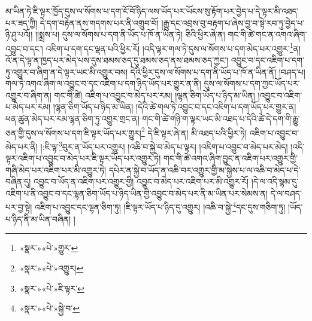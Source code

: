 མ་ཡིན་ཏེ་ཇི་ལྟར་ཁྱོད་དུས་ལ་སོགས་པ་དག་ངོ་བོ་ཉིད་ལས་ཡོད་པར་ཡོངས་སུ་རྟོག་པར་བྱེད་པ་དེ་ལྟར་མི་འཐད་པར་ཟད་ཀྱི། དེ་དག་བརྟེན་ནས་གདགས་པར་ནི་འགྲུབ་བོ། །རྒྱུ་དང་འབྲས་བུ་བརྟག་པ་ཞེས་བྱ་བ་སྟེ་རབ་ཏུ་བྱེད་པ་ཉི་ཤུ་པའོ།། །།སྨྲས་པ། དུས་ལ་སོགས་པ་དག་ནི་ཡོད་པ་ཁོ་ན་ཡིན་ཏེ། ཅིའི་ཕྱིར་ཞེ་ན། གང་གི་ཚེ་གང་ན་འགའ་ཞིག་འབྱུང་བ་དང་། འཇིག་པ་དག་དང་ལྡན་པའི་ཕྱིར་རོ། །འདི་ལྟར་གལ་ཏེ་དུས་ལ་སོགས་པ་དག་མེད་པར་འགྱུར་\footnote{«སྣར་»«པེ་»གྱུར་}ན། འོ་ན་དེ་ལྟ་ན་ཁྱད་པར་མེད་པས་དུས་ཐམས་ཅད་དུ་ཐམས་ཅད་ནས་ཐམས་ཅད་ཀྱང་། འབྱུང་བ་དང་འཇིག་པ་དག་ཏུ་འགྱུར་བ་ཞིག་ན་དེ་ལྟར་ཡང་མི་འགྱུར་བས། དེའི་ཕྱིར་དུས་ལ་སོགས་པ་དག་ནི་ཡོད་པ་ཁོ་ན་ཡིན་ནོ། །བཤད་པ། གལ་ཏེ་འགའ་ཞིག་ལ་འབྱུང་བ་དང་འཇིག་པ་དག་ཉིད་ཡོད་པར་གྱུར་ན་ནི། དུས་ལ་སོགས་པ་དག་ཀྱང་ཡོད་པར་འགྱུར་བ་ཞིག་ན། གང་གི་ཚེ། འཇིག་པ་འབྱུང་བ་མེད་པར་རམ། །ལྷན་ཅིག་ཡོད་པ་ཉིད་མ་ཡིན། །འབྱུང་བ་འཇིག་པ་མེད་པར་རམ། །ལྷན་ཅིག་ཡོད་པ་ཉིད་མ་ཡིན། །དེའི་ཚེ་གལ་ཏེ་འབྱུང་བ་དང་འཇིག་པ་དག་ཡོད་པར་གྱུར་ན། ཕན་ཚུན་མེད་པར་རམ་ལྷན་ཅིག་ཏུ་འགྱུར་གྲང་ན། གང་གི་ཚེ་གཉི་ག་ལྟར་ཡང་མི་འཐད་པ་དེའི་ཚེ་དེ་དག་གི་རྒྱུ་ཅན་གྱི་དུས་ལ་སོགས་པ་དག་ཇི་ལྟར་ཡོད་པར་གྱུར།\footnote{«སྣར་»«པེ་»འགྱུར།} དེ་ཇི་ལྟར་ཞེ་ན། མི་འཐད་པའི་ཕྱིར་ཏེ། འཇིག་པ་འབྱུང་བ་མེད་པར་ནི། །:ཇི་ལྟ་\footnote{«སྣར་»«པེ་»ཇི་ལྟར་}བུར་ན་ཡོད་པར་འགྱུར། །འཆི་བ་སྐྱེ་བ་མེད་པ་ལྟར། །འཇིག་པ་འབྱུང་བ་མེད་པར་མེད། །འདི་ལྟར་འཇིག་པ་འབྱུང་བ་མེད་པར་ཇི་ལྟར་ཡོད་པར་འགྱུར་ཏེ། གང་གི་ཚེ་འགའ་ཞིག་བྱུང་ན་འཇིག་པར་འགྱུར་གྱི་གཞི་མེད་པར་འཇིག་པར་མི་འགྱུར་ཏེ། དཔེར་ན་སྐྱེ་བ་ཡོད་ན་འཆི་བར་འགྱུར་གྱི་མ་སྐྱེས་པ་ལ་འཆི་བ་མེད་པ་དེ་བཞིན་དུ། འབྱུང་བ་ཡོད་ན་འཇིག་པར་འགྱུར་གྱི། འབྱུང་བ་མེད་པར་འཇིག་པར་མི་འགྱུར་རོ། །དེ་ལ་འདི་སྙམ་དུ་འཇིག་པ་ནི་འབྱུང་བ་དང་ལྷན་ཅིག་ཡོད་པ་ཉིད་ཡིན་གྱི་འབྱུང་བ་མེད་པར་ནི་མ་ཡིན་པར་སེམས་ན། དེ་ལ་བཤད་པར་བྱ་སྟེ། འཇིག་པ་འབྱུང་དང་ལྷན་ཅིག་ཏུ། །ཇི་ལྟར་ཡོད་པ་ཉིད་དུ་འགྱུར། །འཆི་བ་སྐྱེ་\footnote{«སྣར་»«པེ་»སྐྱེ་བ་}དང་དུས་གཅིག་ཏུ། །ཡོད་པ་ཉིད་ནི་མ་ཡིན་བཞིན། །
